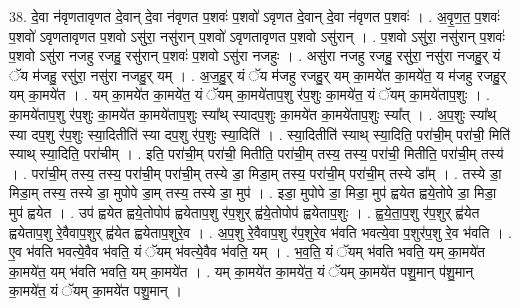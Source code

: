 \documentclass[17pt]{extarticle}
\begin{document}
38. दे॒वा न॑वृणतावृणत दे॒वान् दे॒वा न॑वृणत प॒शवः॑ प॒शवो॑ ऽवृणत दे॒वान् दे॒वा न॑वृणत प॒शवः॑ । . अ॒वृ॒ण॒त॒ प॒शवः॑ प॒शवो॑ ऽवृणतावृणत प॒शवो ऽसु॑रा॒ नसु॑रान् प॒शवो॑ ऽवृणतावृणत प॒शवो ऽसु॑रान् । . प॒शवो ऽसु॑रा॒ नसु॑रान् प॒शवः॑ प॒शवो ऽसु॑रा नजहु रजहु॒ रसु॑रान् प॒शवः॑ प॒शवो ऽसु॑रा नजहुः । . असु॑रा नजहु रजहु॒ रसु॑रा॒ नसु॑रा नजहु॒र् यं ॅय म॑जहु॒ रसु॑रा॒ नसु॑रा नजहु॒र् यम् । . अ॒ज॒हु॒र् यं ॅय म॑जहु रजहु॒र् यम् का॒मये॑त का॒मये॑त॒ य म॑जहु रजहु॒र् यम् का॒मये॑त । . यम् का॒मये॑त का॒मये॑त॒ यं ॅयम् का॒मये॑ताप॒शु र॑प॒शुः का॒मये॑त॒ यं ॅयम् का॒मये॑ताप॒शुः । . का॒मये॑ताप॒शु र॑प॒शुः का॒मये॑त का॒मये॑ताप॒शुः स्या᳚थ् स्यादप॒शुः का॒मये॑त का॒मये॑ताप॒शुः स्या᳚त् । . अ॒प॒शुः स्या᳚थ् स्या दप॒शु र॑प॒शुः स्या॒दितीति॑ स्या दप॒शु र॑प॒शुः स्या॒दिति॑ । . स्या॒दितीति॑ स्याथ् स्या॒दिति॒ परा॑ची॒म् परा॑ची॒ मिति॑ स्याथ् स्या॒दिति॒ परा॑चीम् । . इति॒ परा॑ची॒म् परा॑ची॒ मितीति॒ परा॑ची॒म् तस्य॒ तस्य॒ परा॑ची॒ मितीति॒ परा॑ची॒म् तस्य॑ । . परा॑ची॒म् तस्य॒ तस्य॒ परा॑ची॒म् परा॑ची॒म् तस्ये डा॒ मिडा॒म् तस्य॒ परा॑ची॒म् परा॑ची॒म् तस्ये डा᳚म् । . तस्ये डा॒ मिडा॒म् तस्य॒ तस्ये डा॒ मुपोपे डा॒म् तस्य॒ तस्ये डा॒ मुप॑ । . इडा॒ मुपोपे डा॒ मिडा॒ मुप॑ ह्वयेत ह्वये॒तोपे डा॒ मिडा॒ मुप॑ ह्वयेत । . उप॑ ह्वयेत ह्वये॒तोपोप॑ ह्वयेताप॒शु र॑प॒शुर् ह्व॑ये॒तोपोप॑ ह्वयेताप॒शुः । . ह्व॒ये॒ता॒प॒शु र॑प॒शुर् ह्व॑येत ह्वयेताप॒शु रे॒वैवाप॒शुर् ह्व॑येत ह्वयेताप॒शुरे॒व । . अ॒प॒शु रे॒वैवाप॒शु र॑प॒शुरे॒व भ॑वति भवत्ये॒वा प॒शुर॑प॒शु रे॒व भ॑वति । . ए॒व भ॑वति भवत्ये॒वैव भ॑वति॒ यं ॅयम् भ॑वत्ये॒वैव भ॑वति॒ यम् । . भ॒व॒ति॒ यं ॅयम् भ॑वति भवति॒ यम् का॒मये॑त का॒मये॑त॒ यम् भ॑वति भवति॒ यम् का॒मये॑त । . यम् का॒मये॑त का॒मये॑त॒ यं ॅयम् का॒मये॑त पशु॒मान् प॑शु॒मान् का॒मये॑त॒ यं ॅयम् का॒मये॑त पशु॒मान् । \newline
\pagebreak
{}
\end{document}
